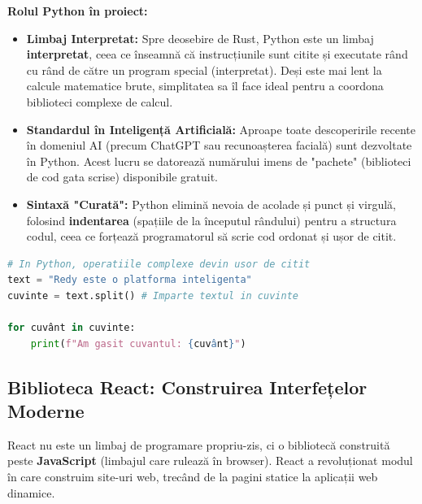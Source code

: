 \documentclass[12pt,a4paper]{article}
\begin{document}
\textbf{Rolul Python în proiect:}
\begin{itemize}
    \item \textbf{Limbaj Interpretat:} Spre deosebire de Rust, Python este un limbaj \textbf{interpretat}, ceea ce înseamnă că instrucțiunile sunt citite și executate rând cu rând de către un program special (interpretat). Deși este mai lent la calcule matematice brute, simplitatea sa îl face ideal pentru a coordona biblioteci complexe de calcul.
    \item \textbf{Standardul în Inteligență Artificială:} Aproape toate descoperirile recente în domeniul AI (precum ChatGPT sau recunoașterea facială) sunt dezvoltate în Python. Acest lucru se datorează numărului imens de "pachete" (biblioteci de cod gata scrise) disponibile gratuit.
    \item \textbf{Sintaxă "Curată":} Python elimină nevoia de acolade și punct și virgulă, folosind \textbf{indentarea} (spațiile de la începutul rândului) pentru a structura codul, ceea ce forțează programatorul să scrie cod ordonat și ușor de citit.
\end{itemize}

\begin{lstlisting}[language=Python, caption=Simplitatea Python in procesarea textului]
# In Python, operatiile complexe devin usor de citit
text = "Redy este o platforma inteligenta"
cuvinte = text.split() # Imparte textul in cuvinte

for cuvânt in cuvinte:
    print(f"Am gasit cuvantul: {cuvânt}")
\end{lstlisting}

\newpage

\subsection{Biblioteca React: Construirea Interfețelor Moderne}

React nu este un limbaj de programare propriu-zis, ci o bibliotecă construită peste \textbf{JavaScript} (limbajul care rulează în browser). React a revoluționat modul în care construim site-uri web, trecând de la pagini statice la aplicații web dinamice.
\end{document}
